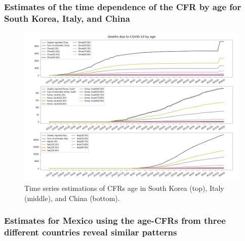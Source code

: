 \documentclass[8pt]{article}
\begin{document}
\subsubsection{Estimates of the time dependence of the CFR by age for South Korea, Italy, and China}

\begin{figure}[h]
    \centering
    \includegraphics[width=\textwidth]{figures/tsam_Covid19_JHU_cfr+propDeathCasesByAgeTS.png}
    \caption{Time series estimations of CFRs age in South Korea (top), Italy (middle), and China (bottom).}
    \label{fig:cfrsAge}
\end{figure}



\subsubsection{Estimates for Mexico using the age-CFRs from three different countries reveal similar patterns}
\end{document}

